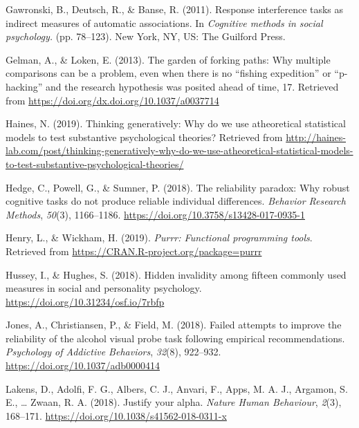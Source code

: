 \documentclass[
  english,
  man,floatsintext]{apa6}
\begin{document}
\leavevmode\hypertarget{ref-gawronski_response_2011-1}{}%
Gawronski, B., Deutsch, R., \& Banse, R. (2011). Response interference tasks as indirect measures of automatic associations. In \emph{Cognitive methods in social psychology.} (pp. 78--123). New York, NY, US: The Guilford Press.

\leavevmode\hypertarget{ref-gelman_garden_2013}{}%
Gelman, A., \& Loken, E. (2013). The garden of forking paths: Why multiple comparisons can be a problem, even when there is no ``ﬁshing expedition'' or ``p-hacking'' and the research hypothesis was posited ahead of time, 17. Retrieved from \url{https://doi.org/dx.doi.org/10.1037/a0037714}

\leavevmode\hypertarget{ref-haines_thinking_2019}{}%
Haines, N. (2019). Thinking generatively: Why do we use atheoretical statistical models to test substantive psychological theories? Retrieved from \url{http://haines-lab.com/post/thinking-generatively-why-do-we-use-atheoretical-statistical-models-to-test-substantive-psychological-theories/}

\leavevmode\hypertarget{ref-hedge_reliability_2018}{}%
Hedge, C., Powell, G., \& Sumner, P. (2018). The reliability paradox: Why robust cognitive tasks do not produce reliable individual differences. \emph{Behavior Research Methods}, \emph{50}(3), 1166--1186. \url{https://doi.org/10.3758/s13428-017-0935-1}

\leavevmode\hypertarget{ref-R-purrr}{}%
Henry, L., \& Wickham, H. (2019). \emph{Purrr: Functional programming tools}. Retrieved from \url{https://CRAN.R-project.org/package=purrr}

\leavevmode\hypertarget{ref-hussey_hidden_2018}{}%
Hussey, I., \& Hughes, S. (2018). Hidden invalidity among fifteen commonly used measures in social and personality psychology. \url{https://doi.org/10.31234/osf.io/7rbfp}

\leavevmode\hypertarget{ref-jones_failed_2018-1}{}%
Jones, A., Christiansen, P., \& Field, M. (2018). Failed attempts to improve the reliability of the alcohol visual probe task following empirical recommendations. \emph{Psychology of Addictive Behaviors}, \emph{32}(8), 922--932. \url{https://doi.org/10.1037/adb0000414}

\leavevmode\hypertarget{ref-lakens_justify_2018}{}%
Lakens, D., Adolfi, F. G., Albers, C. J., Anvari, F., Apps, M. A. J., Argamon, S. E., \ldots{} Zwaan, R. A. (2018). Justify your alpha. \emph{Nature Human Behaviour}, \emph{2}(3), 168--171. \url{https://doi.org/10.1038/s41562-018-0311-x}
\end{document}
